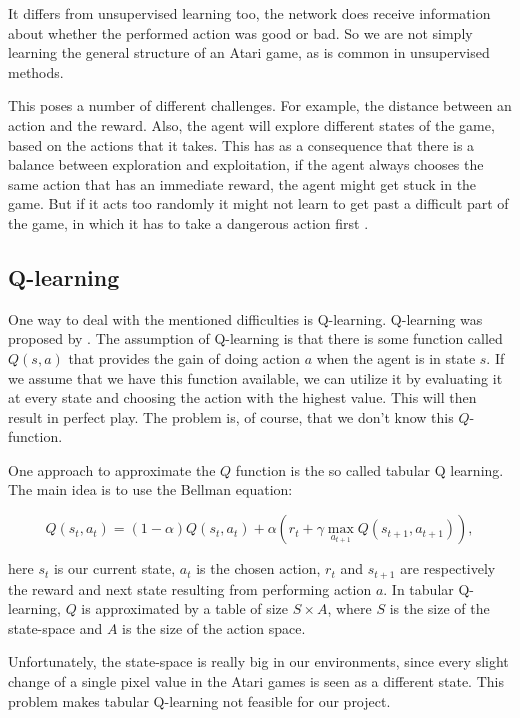 \documentclass{article}
\begin{document}
It differs from unsupervised learning too, the network does receive information about whether the performed action was good or bad. So we are not simply learning the general structure of an Atari game, as is common in unsupervised methods.

This poses a number of different challenges. For example, the distance between an action and the reward. Also, the agent will explore different states of the game, based on the actions that it takes. This has as a consequence that there is a balance between exploration and exploitation, if the agent always chooses the same action that has an immediate reward, the agent might get stuck in the game. But if it acts too randomly it might not learn to get past a difficult part of the game, in which it has to take a dangerous action first \cite{reinforcementLearningDraft}.

\subsection{Q-learning}

One way to deal with the mentioned difficulties is Q-learning. Q-learning was proposed by \citeauthor{watkins1992q} \cite{watkins1992q}. The assumption of Q-learning is that there is some function called $Q(s, a)$ that provides the gain of doing action $a$ when the agent is in state $s$. If we assume that we have this function available, we can utilize it by evaluating it at every state and choosing the action with the highest value. This will then result in perfect play. The problem is, of course, that we don't know this $Q$-function. 

One approach to approximate the $Q$ function is the so called tabular Q learning. The main idea is to use the Bellman equation: 

\[
	Q(s_t,a_t) = (1 - \alpha) Q(s_t, a_t) + \alpha(r_t + \gamma \max_{a_{t+1}} Q(s_{t+1},a_{t+1})),
\]

here $s_t$ is our current state, $a_t$ is the chosen action, $r_t$ and $s_{t+1}$ are respectively the reward and next state resulting from performing action $a$. In tabular Q-learning, $Q$ is approximated by a table of size $S \times A$, where $S$ is the size of the state-space and $A$ is the size of the action space. 

Unfortunately, the state-space is really big in our environments, since every slight change of a single pixel value in the Atari games is seen as a different state. This problem makes tabular Q-learning not feasible for our project.
\end{document}

